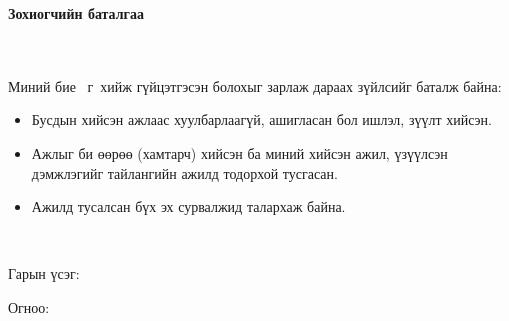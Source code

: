 \maketitle

\doublespace

\begin{huge}
\textbf{Зохиогчийн баталгаа}
\end{huge} \\ \ \\
\doublespace
Миний бие \@author \ \@degreeName г\ хийж гүйцэтгэсэн болохыг зарлаж дараах зүйлсийг баталж байна:
\begin{itemize}
\item Бусдын хийсэн ажлаас хуулбарлаагүй, ашигласан бол ишлэл, зүүлт хийсэн.
\item Ажлыг би өөрөө (хамтарч) хийсэн ба миний хийсэн ажил, үзүүлсэн дэмжлэгийг тайлангийн ажилд тодорхой тусгасан.
\item Ажилд тусалсан бүх эх сурвалжид талархаж байна.
\end{itemize}
\

Гарын үсэг: \underline{\hspace{5cm}}

Огноо: 	\ \ \underline{\hspace{3cm}}

\setcounter{tocdepth}{1}
\tableofcontents

\listoffigures

\listoftables

\lstlistoflistings

\newpage
\newpage

\renewcommand{\cftlabel}{Зураг}


\doublespace
{}
